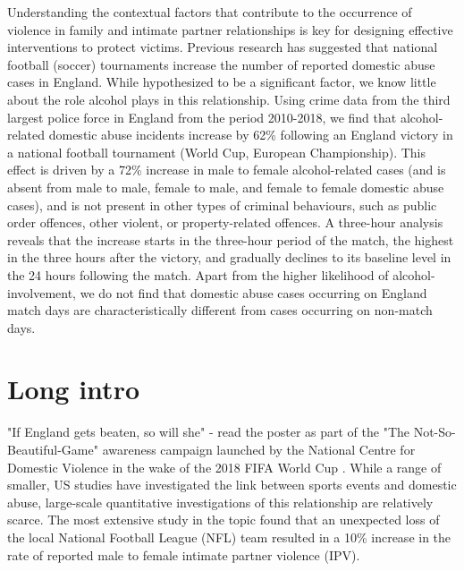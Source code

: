 \documentclass[12pt, letterpaper]{article}
\begin{document}
Understanding the contextual factors that contribute to the occurrence of violence in family and intimate partner relationships is key for designing effective interventions to protect victims. Previous research has suggested that national football (soccer) tournaments increase the number of reported domestic abuse cases in England\autocite{Kirby2014, Brimicombe2012}. While hypothesized to be a significant factor, we know little about the role alcohol plays in this relationship. Using crime data from the third largest police force in England from the period 2010-2018, we find that alcohol-related domestic abuse incidents increase by 62\% following an England victory in a national football tournament (World Cup, European Championship). This effect is driven by a 72\% increase in male to female alcohol-related cases (and is absent from male to male, female to male, and female to female domestic abuse cases), and is not present in other types of criminal behaviours, such as public order offences, other violent, or property-related offences. A three-hour analysis reveals that the increase starts in the three-hour period of the match, the highest in the three hours after the victory, and gradually declines to its baseline level in the 24 hours following the match. Apart from the higher likelihood of alcohol-involvement, we do not find that domestic abuse cases occurring on England match days are characteristically different from cases occurring on non-match days.


\section{Long intro}

"If England gets beaten, so will she" - read the poster as part of the "The Not-So-Beautiful-Game" awareness campaign launched by the National Centre for Domestic Violence in the wake of the 2018 FIFA World Cup \autocite{NCDV}. While a range of smaller, US studies have investigated the link between sports events and domestic abuse\autocite{Williams2014}, large-scale quantitative investigations of this relationship are relatively scarce. The most extensive study in the topic found that an unexpected loss of the local National Football League (NFL) team resulted in a 10\% increase in the rate of reported male to female intimate partner violence (IPV)\autocite{Card2011}. 
\end{document}
